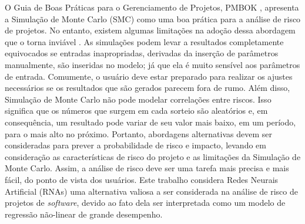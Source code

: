 O Guia de Boas Práticas para o Gerenciamento de Projetos, PMBOK \cite{PMBOK2008}, apresenta a Simulação de Monte Carlo (SMC) como uma boa prática para a análise de risco de projetos. No entanto, existem algumas limitações na adoção dessa abordagem que o torna inviável \cite{Ibbotson2005}. As simulações podem levar a resultados completamente equivocados se entradas inapropriadas, derivadas da inserção de parâmetros manualmente, são inseridas no modelo; já que ela é muito sensível aos parâmetros de entrada. Comumente, o usuário deve estar preparado para realizar os ajustes necessários se os resultados que são gerados parecem fora de rumo. Além disso, Simulação de Monte Carlo não pode modelar correlações entre riscos. Isso significa que os números que surgem em cada sorteio são aleatórios e, em consequência, um resultado pode variar de seu valor mais baixo, em um período, para o mais alto no próximo. Portanto, abordagens alternativas devem ser consideradas para prever a probabilidade de risco e impacto, levando em consideração as características de risco do projeto e as limitações da Simulação de Monte Carlo. Assim, a análise de risco deve ser uma tarefa mais precisa e mais fácil, do ponto de vista dos usuários. Este trabalho considera Redes Neurais Artificial (RNAs) uma alternativa valiosa a ser considerada na análise de risco de projetos de \textit{software}, devido ao fato dela ser interpretada como um modelo de regressão não-linear de grande desempenho.

